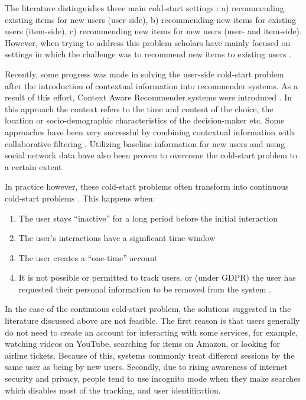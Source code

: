 \documentclass[a4paper,12pt]{article}
\begin{document}
The literature distinguishes three main cold-start settings \citep{park2009pairwise}: a) recommending existing items for new users (user-side), b) recommending new items for existing users (item-side), c) recommending new items for new users (user- and item-side). However, when trying to address this problem scholars have mainly focused on settings in which the challenge was to recommend new items to existing users \citep{zhang2010solving}.

Recently, some progress was made in solving the user-side cold-start problem after the introduction of contextual information into recommender systems. As a result of this effort, Context Aware Recommender systems were introduced \citep{adomavicius2011context}. In this approach the context refers to the time and content of the choice, the location or socio-demographic characteristics of the decision-maker etc.  Some approaches have been very successful by combining contextual information with collaborative filtering \citep{aharon2013off,bykau2013coping,saveski2014item}. Utilizing baseline information for new users \citep{kluver2014evaluating} and using social network data \citep{guy2009personalized} have also been proven to overcome the cold-start problem to a certain extent.

In practice however, these cold-start problems often transform into continuous cold-start problems \citep{kiseleva2016beyond}. This happens when:
\begin{enumerate}
    \item The user stays ``inactive'' for a long period before the initial interaction
    \item The user's interactions have a significant time window
    \item The user creates a ``one-time'' account
    \item It is not possible or permitted to track users, or (under GDPR) the user has requested their personal information to be removed from the system \citep{hildebrandt2022issue}.
\end{enumerate}

In the case of the continuous cold-start problem, the solutions suggested in the literature discussed above are not feasible. The first reason is that users generally do not need to create an account for interacting with some services, for example,  watching videos on YouTube, searching for items on Amazon, or looking for airline tickets. Because of this, systems commonly treat different sessions by the same user as being by new users. Secondly, due to rising awareness of internet security and privacy, people tend to use incognito mode when they make searches \citep{anton2010internet} which disables most of the tracking, and user identification.
\end{document}
